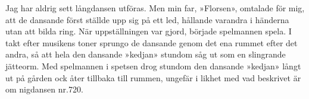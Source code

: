 \pagestyle{empty}
\vspace*{7cm}
\begin{adjustwidth*}{29mm}{29mm}
Jag har aldrig sett långdansen utföras. Men min far, »Florsen», omtalade
för mig, att de dansande först ställde upp sig på ett led, hållande
varandra i händerna utan att bilda ring. \textemdash{} När uppställningen
var gjord, började spelmannen spela. I takt efter musikens toner sprungo
de dansande genom det ena rummet efter det andra, så att hela den
dansande »kedjan» stundom såg ut som en slingrande jätteorm. Med spelmannen
i spetsen drog stundom den dansande »kedjan» långt ut på gården ock
åter tillbaka till rummen, ungefär i likhet med vad beskrivet är om
nigdansen nr.\@ 720. %
\end{adjustwidth*}
\newpage
\pagestyle{fancy}